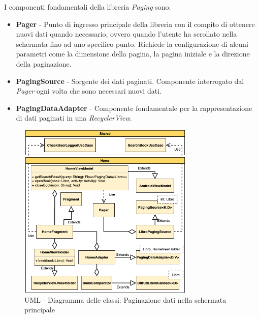I componenti fondamentali della libreria \textit{Paging} sono:
\begin{itemize}
    \item \textbf{Pager} - Punto di ingresso principale della libreria con il compito di ottenere nuovi dati quando necessario, ovvero quando l'utente ha scrollato nella schermata fino ad uno specifico punto. Richiede la configurazione di alcuni parametri come la dimensione della pagina, la pagina iniziale e la direzione della paginazione. 
    \item \textbf{PagingSource} - Sorgente dei dati paginati. Componente interrogato dal \textit{Pager} ogni volta che sono necessari nuovi dati.
    \item \textbf{PagingDataAdapter} - Componente fondamentale per la rappresentazione di dati paginati in una \textit{RecyclerView}.
\end{itemize}

\begin{figure}[H]
    \centering
    \includegraphics[width=0.75\textwidth]{img/android-viewmodel.png}
    \caption{UML - Diagramma delle classi: Paginazione dati nella schermata principale}
    \label{android-viewmodel-png}
\end{figure}

